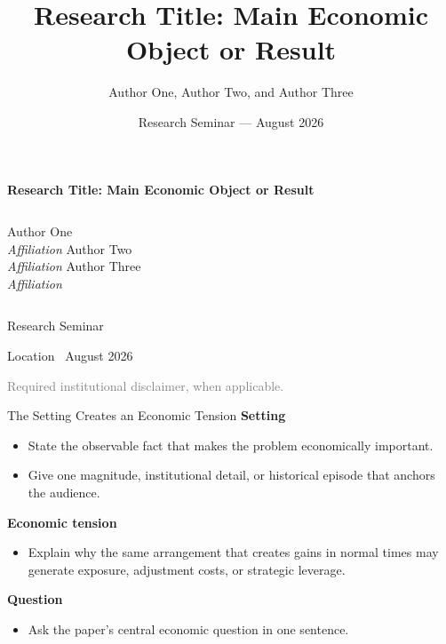 \documentclass[9pt,aspectratio=169,xcolor=dvipsnames]{beamer}
\title{Research Title: Main Economic Object or Result}
\author{Author One, Author Two, and Author Three}
\date{Research Seminar --- August 2026}
\newcommand{\smallnote}[1]{{\scriptsize\textcolor{grey}{#1}}}
\newcommand{\resultlabel}[1]{\textbf{\color{DarkBlue}#1}}
\newcommand{\modelheading}[1]{\resultlabel{#1}}
\newenvironment{itemize2}
{\begin{itemize}\setlength{\itemsep}{5pt}\setlength{\parskip}{1.5pt}\setlength{\parsep}{1.5pt}}
{\end{itemize}}
\begin{document}
\begin{frame}[plain,noframenumbering,label=main_title]
\vspace*{0.35cm}
\begin{center}
{\Large\bfseries\color{DarkBlue}Research Title: Main Economic Object or Result\par}
\vspace{1.15cm}
\begin{columns}[t,onlytextwidth]
  \centering Author One\\[-1pt]\textit{\scriptsize\color{gray}Affiliation}
  \centering Author Two\\[-1pt]\textit{\scriptsize\color{gray}Affiliation}
  \centering Author Three\\[-1pt]\textit{\scriptsize\color{gray}Affiliation}
\end{columns}
\vspace{1.15cm}
{\small\color{DarkBlue}Research Seminar\par}\vspace{4pt}
{\scriptsize\color{gray}Location \textperiodcentered\ August 2026\par}
\end{center}
\vfill
\smallnote{Required institutional disclaimer, when applicable.}
\end{frame}

\begin{frame}[t,label=motivation]{The Setting Creates an Economic Tension}
\footnotesize
\vspace{1.2em}
\modelheading{Setting}
\begin{itemize2}
  \item State the observable fact that makes the problem economically important.
  \item Give one magnitude, institutional detail, or historical episode that anchors the audience.
\end{itemize2}
\pause
\medskip
\modelheading{Economic tension}
\begin{itemize2}
  \item Explain why the same arrangement that creates gains in normal times may generate exposure, adjustment costs, or strategic leverage.
\end{itemize2}
\pause
\medskip
\resultlabel{Question}\par
\begin{itemize2}
  \item Ask the paper's central economic question in one sentence.
\end{itemize2}
\end{frame}
\end{document}
